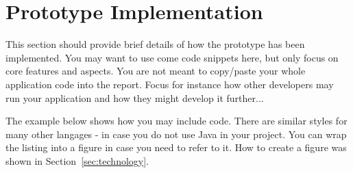 \section{Prototype Implementation}
\label{sec:implementation}

This section should provide brief details of how the prototype has been implemented.
You may want to use come code snippets here, but only focus on core features and aspects.
You are not meant to copy/paste your whole application code into the report.
Focus for instance how other developers may run your application and how they might develop it further...


The example below shows how you may include code. There are similar
styles for many other langages - in case you do not use Java in your
project. You can wrap the listing into a figure in case you need to
refer to it. How to create a figure was shown in Section~\ref{sec:technology}.